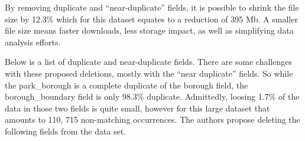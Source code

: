 \documentclass[12pt, titlepage]{article}
\begin{document}

 \label{sec:filesize}
By removing duplicate and ``near-duplicate'' fields, it is possible to 
shrink the file size by 12.3\% which for this dataset equates to a 
reduction of 395 Mb. A smaller file size means faster downloads, 
less storage impact, as well as simplifying data analysis efforts.  
 
 
Below is a list of duplicate and near-duplicate fields. There are 
some challenges with these proposed deletions, mostly with 
the ``near duplicate'' fields.  So while the park\_borough is 
a complete duplicate of the borough field, the 
borough\_boundary field is only 98.3\% duplicate. Admittedly, 
loosing 1.7\% of the data in those two fields is quite small, however
for this large dataset that amounts to 110, 715 
non-matching occurrences. The authors  propose 
deleting the following fields from the data set.
 
\end{document}
